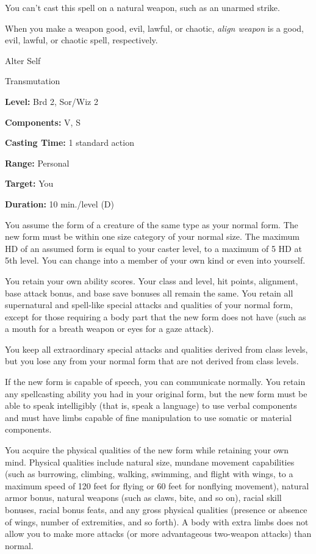\documentclass{article}
\begin{document}
You can't cast this spell on a natural weapon, such as an unarmed strike.

When you make a weapon good, evil, lawful, or chaotic, \textit{align weapon }is 
a good, evil, lawful, or chaotic spell, respectively.

\vspace{12pt}
Alter Self

Transmutation

\textbf{Level:} Brd 2, Sor/Wiz 2

\textbf{Components:} V, S

\textbf{Casting Time:} 1 standard action

\textbf{Range:} Personal

\textbf{Target:} You

\textbf{Duration:} 10 min./level (D)

You assume the form of a creature of the same type as your normal form. The new 
form must be within one size category of your normal size. The maximum HD of an 
assumed form is equal to your caster level, to a maximum of 5 HD at 5th level. 
You can change into a member of your own kind or even into yourself.

You retain your own ability scores. Your class and level, hit points, alignment, 
base attack bonus, and base save bonuses all remain the same. You retain all supernatural 
and spell-like special attacks and qualities of your normal form, except for those 
requiring a body part that the new form does not have (such as a mouth for a breath 
weapon or eyes for a gaze attack).

You keep all extraordinary special attacks and qualities derived from class levels, 
but you lose any from your normal form that are not derived from class levels.

If the new form is capable of speech, you can communicate normally. You retain 
any spellcasting ability you had in your original form, but the new form must be 
able to speak intelligibly (that is, speak a language) to use verbal components 
and must have limbs capable of fine manipulation to use somatic or material components.

You acquire the physical qualities of the new form while retaining your own mind. 
Physical qualities include natural size, mundane movement capabilities (such as 
burrowing, climbing, walking, swimming, and flight with wings, to a maximum speed 
of 120 feet for flying or 60 feet for nonflying movement), natural armor bonus, 
natural weapons (such as claws, bite, and so on), racial skill bonuses, racial 
bonus feats, and any gross physical qualities (presence or absence of wings, number 
of extremities, and so forth). A body with extra limbs does not allow you to make 
more attacks (or more advantageous two-weapon attacks) than normal.
\end{document}
